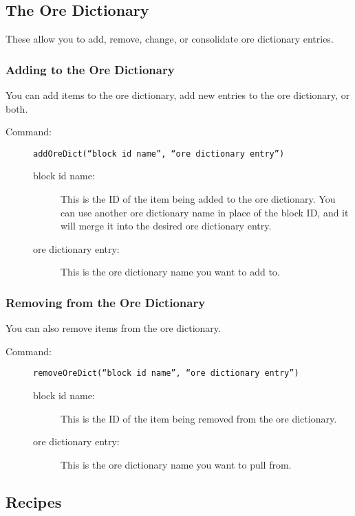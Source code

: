 \documentclass[letterpaper,titlepage,12pt]{article}
\begin{document}
\subsection{The Ore Dictionary}

These allow you to add, remove, change, or consolidate ore dictionary entries.

\subsubsection{Adding to the Ore Dictionary}

You can add items to the ore dictionary, add new entries to the ore dictionary, or both.

\begin{description}
\item[Command:] \texttt{addOreDict(``block id name'', ``ore dictionary entry'')}
\begin{description}
\item [block id name:] This is the ID of the item being added to the ore dictionary.  You can use another ore dictionary name in place of the block ID, and it will merge it into the desired ore dictionary entry.
\item [ore dictionary entry:] This is the ore dictionary name you want to add to.
\end{description}
\end{description}

\subsubsection{Removing from the Ore Dictionary}

You can also remove items from the ore dictionary.

\begin{description}
\item[Command:] \texttt{removeOreDict(``block id name'', ``ore dictionary entry'')}
\begin{description}
\item [block id name:] This is the ID of the item being removed from the ore dictionary.
\item [ore dictionary entry:] This is the ore dictionary name you want to pull from.
\end{description}
\end{description}

\subsection{Recipes}
\end{document}
